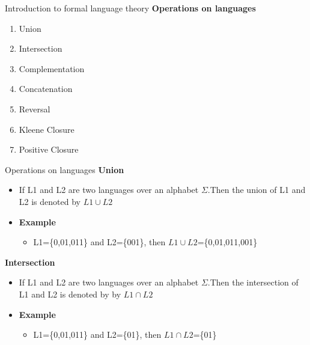 \documentclass{beamer}
\begin{document}
\begin{frame}{Introduction to formal language theory}
	\textbf{Operations on languages}
	\begin{enumerate}
		\item Union
		\item Intersection
		\item Complementation
		\item Concatenation
		\item Reversal
		\item Kleene Closure
		\item Positive Closure
	\end{enumerate}
	
\end{frame}
\begin{frame}{Operations on languages}
	\textbf{Union}
	\begin{itemize}
		\item  If L1 and L2 are two languages over an alphabet $\Sigma$.Then the union of L1 
		and L2 is denoted by $L1 \cup L2$
		\item \textbf{Example}
		\begin{itemize}
			\item L1=\{0,01,011\} and L2=\{001\}, then $L1 \cup L2$=\{0,01,011,001\}
		\end{itemize}
	\end{itemize}
	\textbf{Intersection}
\begin{itemize}
	\item  If L1 and L2 are two languages over an alphabet $\Sigma$.Then the intersection 
	of L1 and L2 is denoted by by $L1 \cap L2$
	\item \textbf{Example}
	\begin{itemize}
		\item L1=\{0,01,011\} and L2=\{01\}, then $L1 \cap L2$=\{01\}
	\end{itemize}
\end{itemize}
\end{frame}
\end{document}
